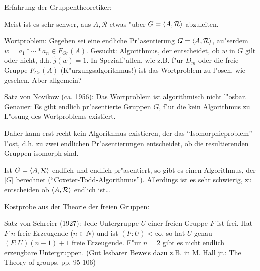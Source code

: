\remark Erfahrung der Gruppentheoretiker:{
  Meist ist es sehr schwer, aus $A,\mathcal R$ etwas "uber 
  $G={\left\langle A,\mathcal R\right\rangle}$ abzuleiten.
  
  Wortproblem: Gegeben sei eine endliche Pr"asentierung $G={\left\langle A,\mathcal R\right\rangle}$,
  au"serdem $w=a_1*\cdots*a_n\in F_{Gr}(A)$.
  Gesucht: Algorithmus, der entscheidet, ob $w$ in $G$ gilt oder nicht, d.h.
  $\tilde j(w)=1$. In Spezialf"allen, wie z.B. f"ur $D_m$ oder die freie
  Gruppe $F_{Gr}(A)$ (K"urzungsalgorithmus!) ist das Wortproblem zu l"osen,
  wie gesehen. Aber allgemein?
  
  Satz von Novikow (ca. 1956): Das Wortproblem ist algorithmisch nicht l"osbar.
  Genauer: Es gibt endlich pr"asentierte Gruppen $G$, f"ur die kein
  Algorithmus zu L"osung des Wortproblems existiert.
  
  Daher kann erst recht kein Algorithmus existieren, der das ``Isomorphieproblem''
  l"ost, d.h. zu zwei endlichen Pr"asentierungen entscheidet, ob die
  resultierenden Gruppen isomorph sind.
  
  Ist $G={\left\langle A,\mathcal R\right\rangle}$ endlich und endlich pr"asentiert, so gibt es 
  einen Algorithmus, der $|G|$ berechnet (``Coxeter-Todd-Algorithmus'').
  Allerdings ist es sehr schwierig, zu entscheiden ob ${\left\langle A,\mathcal R\right\rangle}$
  endlich ist\ldots
  
  Kostprobe aus der Theorie der freien Gruppen:
  
  Satz von Schreier (1927):
  Jede Untergruppe $U$ einer freien Gruppe $F$ ist frei. Hat
  $F$ $n$ freie Erzeugende ($n\in N$) und ist $(F:U)<\infty$, so hat $U$
  genau $(F:U)(n-1)+1$ freie Erzeugende.
  F"ur $n=2$ gibt es nicht endlich erzeugbare Untergruppen. 
  (Gut lesbarer Beweis dazu z.B. in M. Hall jr.: The Theory of groups, pp. 95-106)
  }
